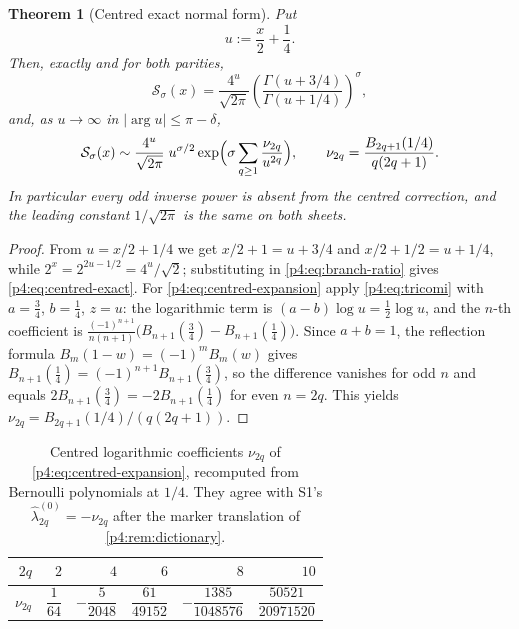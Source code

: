 \documentclass[11pt,a4paper,oneside]{book}
\theoremstyle{plain}
\newtheorem{theorem}{Theorem}[chapter]
\theoremstyle{definition}
\theoremstyle{remark}
\begin{document}
\begin{theorem}[Centred exact normal form]
\label{p4:thm:centred}
Put
\begin{equation}
  u:=\frac x2+\frac14 .
  \label{p4:eq:centred-variable}
\end{equation}
Then, exactly and for both parities,
\begin{equation}
  \boxed{\;
  \mathcal S_\sigma(x)=\frac{4^{u}}{\sqrt{2\pi}}
  \left(\frac{\Gamma(u+3/4)}{\Gamma(u+1/4)}\right)^{\!\sigma},\;}
  \label{p4:eq:centred-exact}
\end{equation}
and, as $u\to\infty$ in $|\arg u|\le\pi-\delta$,
\begin{equation}
  \mathcal S_\sigma(x)\sim\frac{4^{u}}{\sqrt{2\pi}}\;u^{\sigma/2}
  \exp\Bigl(\sigma\sum_{q\ge1}\frac{\nu_{2q}}{u^{2q}}\Bigr),
  \qquad
  \nu_{2q}=\frac{B_{2q+1}(1/4)}{q(2q+1)} .
  \label{p4:eq:centred-expansion}
\end{equation}
In particular \emph{every odd inverse power is absent} from the centred
correction, and the leading constant $1/\sqrt{2\pi}$ is the same on both
sheets.
\end{theorem}

\begin{proof}
From $u=x/2+1/4$ we get $x/2+1=u+3/4$ and $x/2+1/2=u+1/4$, while
$2^{x}=2^{2u-1/2}=4^{u}/\sqrt2$; substituting in \cref{p4:eq:branch-ratio}
gives \cref{p4:eq:centred-exact}.  For \cref{p4:eq:centred-expansion} apply
\cref{p4:eq:tricomi} with $a=\tfrac34$, $b=\tfrac14$, $z=u$: the logarithmic
term is $(a-b)\log u=\tfrac12\log u$, and the $n$-th coefficient is
$\frac{(-1)^{n+1}}{n(n+1)}\bigl(B_{n+1}(\tfrac34)-B_{n+1}(\tfrac14)\bigr)$.
Since $a+b=1$, the reflection formula $B_m(1-w)=(-1)^{m}B_m(w)$ gives
$B_{n+1}(\tfrac14)=(-1)^{n+1}B_{n+1}(\tfrac34)$, so the difference vanishes
for odd $n$ and equals $2B_{n+1}(\tfrac34)=-2B_{n+1}(\tfrac14)$ for even
$n=2q$.  This yields $\nu_{2q}=B_{2q+1}(1/4)/(q(2q+1))$.
\end{proof}

\begin{table}[htbp]
\centering
\caption{Centred logarithmic coefficients $\nu_{2q}$ of
\cref{p4:eq:centred-expansion}, recomputed from Bernoulli polynomials at
$1/4$.  They agree with \textsf{S1}'s $\widehat\lambda^{(0)}_{2q}=-\nu_{2q}$
after the marker translation of \cref{p4:rem:dictionary}.}
\label{p4:tab:nu}
\small
\begin{tabular}{@{}rrrrrr@{}}
\toprule
$2q$ & $2$ & $4$ & $6$ & $8$ & $10$\\
\midrule
$\nu_{2q}$ & $\dfrac1{64}$ & $-\dfrac5{2048}$ & $\dfrac{61}{49152}$
 & $-\dfrac{1385}{1048576}$ & $\dfrac{50521}{20971520}$\\
\bottomrule
\end{tabular}
\end{table}
\end{document}
